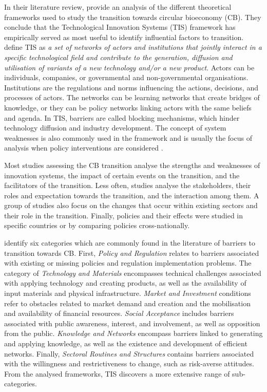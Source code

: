 In their literature review, \cite{gottinger2020studying} provide an analysis of the different theoretical frameworks used to study the transition towards circular bioeconomy (CB). They conclude that the Technological Innovation Systems (TIS) framework has empirically served as most useful to identify influential factors to transition. \cite{markard2008technological} define TIS as \textit{a set of networks of actors and institutions that jointly interact
in a specific technological field and contribute to the
generation, diffusion and utilisation of variants of a
new technology and/or a new product}. Actors can be individuals, companies, or governmental and non-governmental organisations. Institutions are the regulations and norms influencing the actions, decisions, and processes of actors. The networks can be learning networks that create bridges of knowledge, or they can be policy networks linking actors with the same beliefs and agenda. In TIS, barriers are called blocking mechanisms, which hinder technology diffusion and industry development. The concept of system weaknesses is also commonly used in the framework and is usually the focus of analysis when policy interventions are considered \citep{giurca2017forest}.

Most studies assessing the CB transition analyse the strengths and weaknesses of innovation systems, the impact of certain events on the transition, and the facilitators of the transition. Less often, studies analyse the stakeholders, their roles and expectation towards the transition, and the interaction among them. A group of studies also focus on the changes that occur within existing sectors and their role in the transition. Finally, policies and their effects were studied in specific countries or by comparing policies cross-nationally.

\citeauthor{gottinger2020studying} identify six categories which are commonly found in the literature of barriers to transition towards CB.  
First, \textit{Policy and Regulation} relates to barriers associated with existing or missing policies and regulation implementation problems.
The category of \textit{Technology and Materials} encompasses technical challenges associated with applying technology and creating products, as well as the availability of input materials and physical infrastructure. 
\textit{Market and Investment} conditions refer to obstacles related to market demand and creation and the mobilisation and availability of financial resources. \textit{Social Acceptance} includes barriers associated with public awareness, interest, and involvement, as well as opposition from the public. \textit{Knowledge and Networks} encompass barriers linked to generating and applying knowledge, as well as the existence and development of efficient networks. Finally, \textit{Sectoral Routines and Structures} contains barriers associated with the willingness and restrictiveness to change, such as risk-averse attitudes. From the analysed frameworks, TIS discovers a more extensive range of sub-categories.

